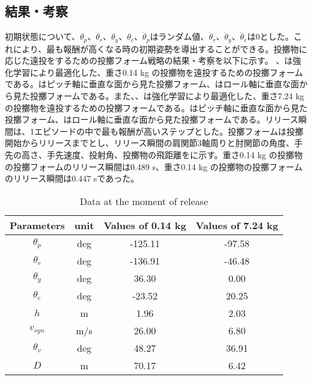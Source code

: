 
\subsection{結果・考察}
初期状態について、$\theta_{p}$、$\theta_{r}$、$\theta_{y}$、$\theta_{e}$、$\dot{\theta}_{p}$はランダム値、$\dot{\theta}_{r}$、$\dot{\theta}_{y}$、$\dot{\theta}_{e}$は0とした。これにより、最も報酬が高くなる時の初期姿勢を導出することができる。投擲物に応じた遠投をするための投擲フォーム戦略の結果・考察を以下に示す。
、は強化学習により最適化した、重さ0.14 kg の投擲物を遠投するための投擲フォームである。はピッチ軸に垂直な面から見た投擲フォーム、はロール軸に垂直な面から見た投擲フォームである。また、、は強化学習により最適化した、重さ7.24 kg の投擲物を遠投するための投擲フォームである。はピッチ軸に垂直な面から見た投擲フォーム、はロール軸に垂直な面から見た投擲フォームである。リリース瞬間は、1エピソードの中で最も報酬が高いステップとした。投擲フォームは投擲開始からリリースまでとし、リリース瞬間の肩関節3軸周りと肘関節の角度、手先の高さ、手先速度、投射角、投擲物の飛距離をに示す。重さ0.14 kg の投擲物の投擲フォームのリリース瞬間は0.489 s、重さ0.14 kg の投擲物の投擲フォームのリリース瞬間は0.447 sであった。

\begin{table}[tb]
  \begin{center}
    \caption{Data at the moment of release}

    \begin{tabular}{c c c c}
      \hline
      Parameters & unit & Values of 0.14 kg & Values of 7.24 kg \\
      \hline
      $\theta_{p}$ & deg & -125.11 & -97.58 \\
      $\theta_{r}$ & deg & -136.91 & -46.48 \\
      $\theta_{y}$ & deg  & 36.30 & 0.00 \\
      $\theta_{e}$ & deg & -23.52 & 20.25 \\
      $h$ & m & 1.96 & 2.03 \\
      $v_{syn}$ & m/s & 26.00 & 6.80 \\
      $\theta_{v}$ & deg & 48.27 & 36.91 \\
      $D$ & m & 70.17 & 6.42 \\
      \hline
    \end{tabular}
  \end{center}
\end{table}

